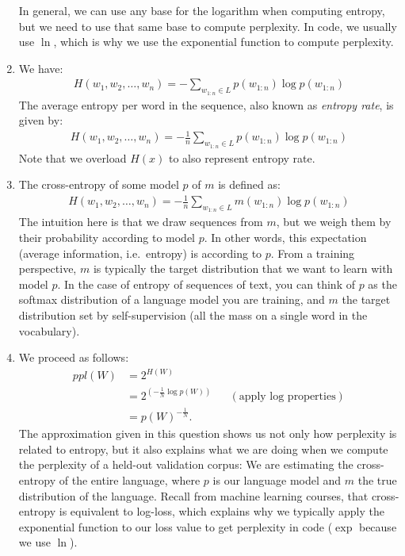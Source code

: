 \documentclass[11pt,a4paper]{article}
\begin{document}
\begin{enumerate}[label=(\alph*)]
          In general, we can use any base for the logarithm when computing
          entropy, but we need to use that same base to compute perplexity.
          In code, we usually use $\ln$, which is why we use the exponential
          function to compute perplexity.
    \item We have:
          \begin{align*}
              H(w_1,w_2,\ldots,w_n) = -\sum_{w_{1:n}\in L} p(w_{1:n})\log p(w_{1:n})
          \end{align*}
          The average entropy per word in the sequence, also known as
          \emph{entropy rate}, is given by:
          \begin{align*}
              H(w_1,w_2,\ldots,w_n) = -\frac{1}{n}\sum_{w_{1:n}\in L} p(w_{1:n})\log p(w_{1:n})
          \end{align*}
          Note that we overload $H(x)$ to also represent entropy rate.
    \item The cross-entropy of some model $p$ of $m$ is defined as:
          \begin{align*}
              H(w_1,w_2,\ldots,w_n) = -\frac{1}{n}\sum_{w_{1:n}\in L} m(w_{1:n})\log p(w_{1:n})
          \end{align*}
          The intuition here is that we draw sequences from $m$, but we weigh
          them by their probability according to model $p$.
          In other words, this expectation (average information, i.e.\ entropy)
          is according to $p$.
          From a training perspective, $m$ is typically the target distribution
          that we want to learn with model $p$.
          In the case of entropy of sequences of text, you can think of $p$
          as the softmax distribution of a language model you are training,
          and $m$ the target distribution set by self-supervision (all the
          mass on a single word in the vocabulary).
    \item We proceed as follows:
          \begin{align*}
              ppl(W) & = 2^{H(W)}                                                                   \\
                     & = 2^{\left(-\frac{1}{N} \log p(W)\right)} &  & (\text{apply log properties}) \\
                     & = p(W)^{-\frac{1}{N}}.
          \end{align*}
          The approximation given in this question shows us not only how
          perplexity is related to entropy, but it also explains what we are
          doing when we compute the perplexity of a held-out validation corpus:
          We are estimating the cross-entropy of the entire language, where $p$
          is our language model and $m$ the true distribution of the language.
          Recall from machine learning courses, that cross-entropy is equivalent
          to log-loss, which explains why we typically apply the exponential
          function to our loss value to get perplexity in code ($\exp$ because
          we use $\ln$).
\end{enumerate}
\end{document}
